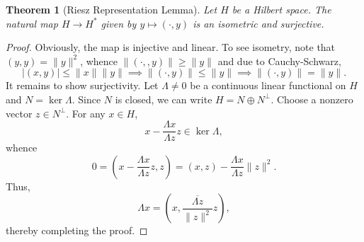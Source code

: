 \documentclass[12pt]{article}
\theoremstyle{thmstyle}
\newtheorem{theorem}{Theorem}[section]
\theoremstyle{defstyle}
\renewcommand{\le}{\leqslant}
\renewcommand{\ge}{\geqslant}
\begin{document}
\begin{theorem}[Riesz Representation Lemma]
    Let $H$ be a Hilbert space. The natural map $H\to H^\ast$ given by $y\mapsto (\cdot, y)$ is an isometric and surjective.
\end{theorem}
\begin{proof}
    Obviously, the map is injective and linear. To see isometry, note that $(y, y) = \|y\|^2$, whence $\|(\cdot, ,y)\|\ge \|y\|$ and due to Cauchy-Schwarz, 
    \begin{equation*}
        |(x, y)|\le \|x\|\|y\|\implies \|(\cdot, y)\|\le \|y\|\implies\|(\cdot, y)\| = \|y\|.
    \end{equation*}
    It remains to show surjectivity. Let $\Lambda\ne 0$ be a continuous linear functional on $H$ and $N = \ker\Lambda$. Since $N$ is closed, we can write $H = N\oplus N^\perp$. Choose a nonzero vector $z\in N^\perp$. For any $x\in H$, 
    \begin{equation*}
        x - \frac{\Lambda x}{\Lambda z}z\in\ker\Lambda,
    \end{equation*}
    whence 
    \begin{equation*}
        0 = \left(x - \frac{\Lambda x}{\Lambda z}z, z\right) = (x, z) - \frac{\Lambda x}{\Lambda z}\|z\|^2.
    \end{equation*}
    Thus, 
    \begin{equation*}
        \Lambda x = \left(x, \frac{\overline{\Lambda z}}{\|z\|^2} z\right),
    \end{equation*}
    thereby completing the proof.
\end{proof}
\end{document}

